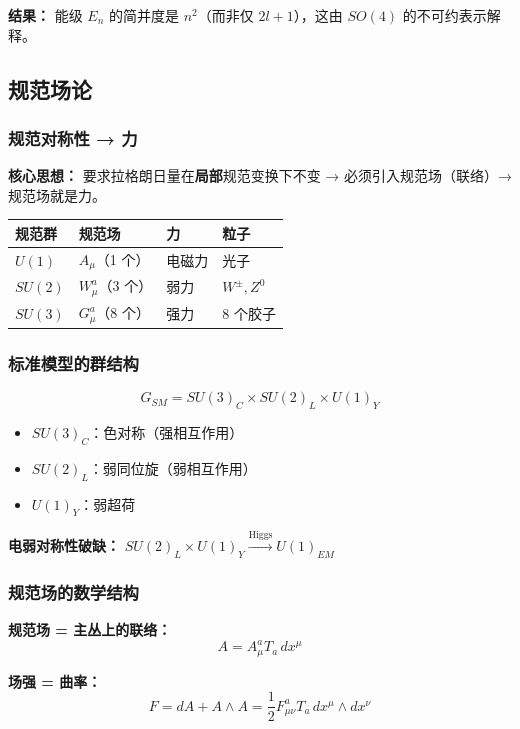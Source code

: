 \textbf{结果：} 能级 $E_n$ 的简并度是 $n^2$（而非仅 $2l+1$），这由 $SO(4)$ 的不可约表示解释。

\subsection{规范场论}

\subsubsection{规范对称性 → 力}

\textbf{核心思想：} 要求拉格朗日量在\textbf{局部}规范变换下不变 → 必须引入规范场（联络）→ 规范场就是力。

\begin{center}
\begin{tabular}{L{2cm}L{3cm}L{3cm}L{4cm}}
\toprule
\textbf{规范群} & \textbf{规范场} & \textbf{力} & \textbf{粒子} \\
\midrule
$U(1)$ & $A_\mu$（1 个） & 电磁力 & 光子 \\
$SU(2)$ & $W_\mu^a$（3 个） & 弱力 & $W^\pm, Z^0$ \\
$SU(3)$ & $G_\mu^a$（8 个） & 强力 & 8 个胶子 \\
\bottomrule
\end{tabular}
\end{center}

\subsubsection{标准模型的群结构}

\[
G_{SM} = SU(3)_C \times SU(2)_L \times U(1)_Y
\]

\begin{itemize}
  \item $SU(3)_C$：色对称（强相互作用）
  \item $SU(2)_L$：弱同位旋（弱相互作用）
  \item $U(1)_Y$：弱超荷
\end{itemize}

\textbf{电弱对称性破缺：} $SU(2)_L \times U(1)_Y \xrightarrow{\text{Higgs}} U(1)_{EM}$

\subsubsection{规范场的数学结构}

\textbf{规范场 = 主丛上的联络：}
\[
A = A_\mu^a T_a\, dx^\mu
\]

\textbf{场强 = 曲率：}
\[
F = dA + A \wedge A = \frac{1}{2}F_{\mu\nu}^a T_a\, dx^\mu \wedge dx^\nu
\]

